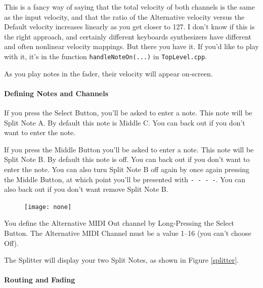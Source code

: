 \documentclass{article}
\begin{document}
This is a fancy way of saying that the total velocity of both channels is the same as the input velocity, and that the ratio of the Alternative velocity versus the Default velocity increases linearly as you get closer to 127.  I don't know if this is the right approach, and certainly different keyboards synthesizers have different and often nonlinear velocity mappings.  But there you have it.  If you'd like to play with it, it's in the function \texttt{handleNoteOn(...)} in \texttt{TopLevel.cpp}.

As you play notes in the fader, their velocity will appear on-screen.

\paragraph{Defining Notes and Channels}

If you press the Select Button, you'll be asked to enter a note.  This note will be Split Note A.  By default this note is Middle C.  You can back out if you don't want to enter the note.

If you press the Middle Button you'll be asked to enter a note.  This note will be Split Note B.  By default this note is off.  You can back out if you don't want to enter the note.  You can also turn Split Note B off again by once again pressing the Middle Button, at which point you'll be presented with \texttt{-~-~-~-}.  You can also back out if you don't want remove Split Note B.

\begin{figure}
\vspace{-1em}\texttt{[image: none]}
\vspace{-2em}
\end{figure}

You define the Alternative MIDI Out channel by Long-Pressing the Select Button.  The Alternative MIDI Channel must be a value 1--16 (you can't choose Off).

The Splitter will display your two Split Notes, as shown in Figure \ref{splitter}.

\paragraph{Routing and Fading}
\end{document}
